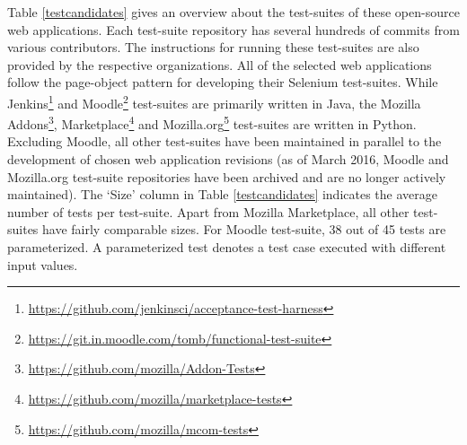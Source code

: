 Table \ref{testcandidates} gives an overview about the test-suites of these open-source web applications. Each test-suite repository has several hundreds of commits from various contributors. The instructions for running these test-suites are also provided by the respective organizations. All of the selected web applications follow the page-object pattern for developing their Selenium test-suites. While Jenkins\footnote{\url{https://github.com/jenkinsci/acceptance-test-harness}} and Moodle\footnote{\url{https://git.in.moodle.com/tomb/functional-test-suite}} test-suites are primarily written in Java, the Mozilla Addons\footnote{\url{https://github.com/mozilla/Addon-Tests}}, Marketplace{\footnote{\url{https://github.com/mozilla/marketplace-tests}}} and Mozilla.org\footnote{\url{https://github.com/mozilla/mcom-tests}} test-suites are written in Python.
Excluding Moodle, all other test-suites have been maintained in parallel to the development of chosen web application revisions 
(as of March 2016, Moodle and Mozilla.org test-suite repositories have been archived and are no longer actively maintained). The `Size' column in Table \ref{testcandidates} indicates the average number of tests per test-suite. Apart from Mozilla Marketplace, all other test-suites have fairly comparable sizes. For Moodle test-suite, 38 out of 45 tests are parameterized. A parameterized test denotes a test case executed with different input values. 
\begin{table}
\centering
{}
\caption{Overview of Selenium test-suites for candidate web applications}
\label{testcandidates}
\end{table}

